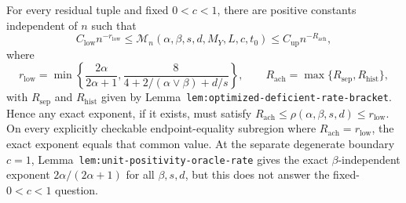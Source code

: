 For every residual tuple and fixed \(0<c<1\), there are positive constants independent of \(n\) such that
\[
C_{\mathrm{low}}n^{-r_{\mathrm{low}}}
\le
\mathcal M_n(\alpha,\beta,s,d,M_Y,L,c,t_0)
\le
C_{\mathrm{up}}n^{-R_{\mathrm{ach}}},
\]
where
\[
r_{\mathrm{low}}
=
\min\left\{
\frac{2\alpha}{2\alpha+1},
\frac{8}{4+2/(\alpha\vee\beta)+d/s}
\right\},
\qquad
R_{\mathrm{ach}}=\max\{R_{\mathrm{sep}},R_{\mathrm{hist}}\},
\]
with \(R_{\mathrm{sep}}\) and \(R_{\mathrm{hist}}\) given by Lemma~\texttt{lem:optimized-deficient-rate-bracket}. Hence any exact exponent, if it exists, must satisfy \(R_{\mathrm{ach}}\le\rho(\alpha,\beta,s,d)\le r_{\mathrm{low}}\). On every explicitly checkable endpoint-equality subregion where \(R_{\mathrm{ach}}=r_{\mathrm{low}}\), the exact exponent equals that common value. At the separate degenerate boundary \(c=1\), Lemma~\texttt{lem:unit-positivity-oracle-rate} gives the exact \(\beta\)-independent exponent \(2\alpha/(2\alpha+1)\) for all \(\beta,s,d\), but this does not answer the fixed-\(0<c<1\) question.